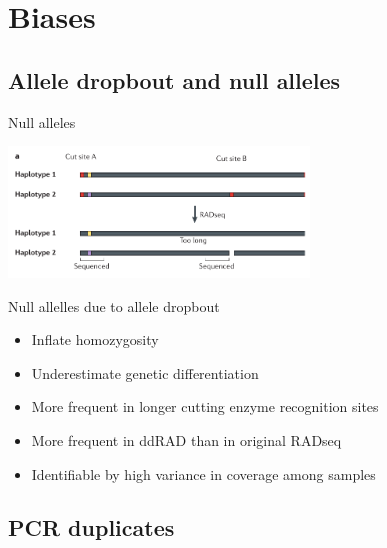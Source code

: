 \documentclass[presentation]{beamer}
\begin{document}
\section{Biases}
\label{sec-3}

\subsection{Allele dropbout and null alleles}
\label{sec-3-1}


\begin{frame}[label=sec-3-1-1]{Null alleles}
\begin{center}
\includegraphics[width=8cm]{Andrews2016Fig2a.png}

\tiny{Null allelles due to allele dropbout\\ \citep{Andrews2016}}
\end{center}
\begin{itemize}
\item Inflate homozygosity
\item Underestimate genetic differentiation
\item More frequent in longer cutting enzyme recognition sites
\item More frequent in ddRAD than in original RADseq
\item Identifiable by high variance in coverage among samples
\end{itemize}
\end{frame}
\subsection{PCR duplicates}
\label{sec-3-2}
\end{document}
